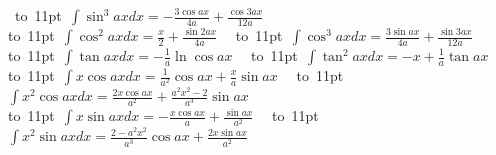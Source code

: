 \begin{footnotesize}
\
\mbox{\vbox to 11pt{  \hbox{$
\int \sin^3 ax dx = -\frac{3 \cos ax}{4a} + \frac{\cos 3ax} {12a} 
$}  }}
\\
\mbox{\vbox to 11pt{  \hbox{$
\int \cos^2 ax dx = \frac{x}{2}+\frac{ \sin 2ax}{4a} 
$}  }}
\
\mbox{\vbox to 11pt{  \hbox{$
\int \cos^3 ax dx = \frac{3 \sin ax}{4a}+\frac{ \sin 3ax}{12a} 
$}  }}
\\
\mbox{\vbox to 11pt{  \hbox{$
\int \tan ax dx = -\frac{1}{a} \ln \cos ax 
$}  }}
\
\mbox{\vbox to 11pt{  \hbox{$
\int \tan^2 ax dx = -x + \frac{1}{a} \tan ax 
$}  }}
\\
\mbox{\vbox to 11pt{  \hbox{$
\int x \cos ax dx = \frac{1}{a^2} \cos ax + \frac{x}{a} \sin ax 
$}  }}
\
\mbox{\vbox to 11pt{  \hbox{$
\int x^2 \cos ax dx = \frac{2 x \cos ax }{a^2} + \frac{ a^2 x^2 - 2  }{a^3} \sin ax 
$}  }}
\\
\mbox{\vbox to 11pt{  \hbox{$
\int x \sin ax dx = -\frac{x \cos ax}{a} + \frac{\sin ax}{a^2} 
$}  }}
\
\mbox{\vbox to 11pt{  \hbox{$
\int x^2 \sin ax dx =\frac{2-a^2x^2}{a^3}\cos ax +\frac{ 2 x \sin ax}{a^2} 
$}  }}
\end{footnotesize}
